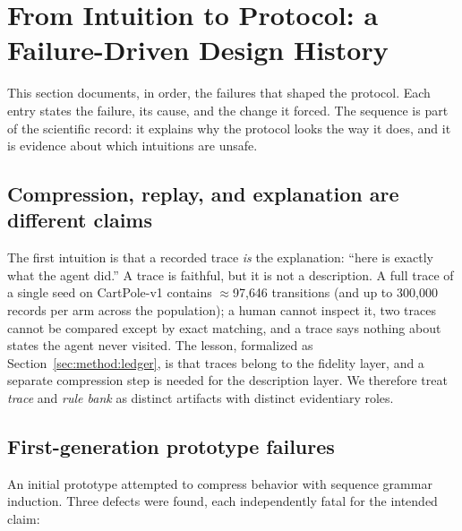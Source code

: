 \documentclass[11pt]{article}
\begin{document}
\section{From Intuition to Protocol: a Failure-Driven Design History}
\label{sec:evolution}

This section documents, in order, the failures that shaped the protocol. Each entry states the
failure, its cause, and the change it forced. The sequence is part of the scientific record: it
explains why the protocol looks the way it does, and it is evidence about which intuitions are
unsafe.

\subsection{Compression, replay, and explanation are different claims}
\label{sec:evolution:replay}

The first intuition is that a recorded trace \emph{is} the explanation: ``here is exactly what the
agent did.'' A trace is faithful, but it is not a description. A full trace of a single seed on
CartPole-v1 contains $\approx$97{,}646 transitions (and up to 300{,}000 records per arm across the
population); a human cannot inspect it, two traces cannot be compared except by exact matching, and
a trace says nothing about states the agent never visited. The lesson, formalized as
Section~\ref{sec:method:ledger}, is that traces belong to the fidelity layer, and a separate
compression step is needed for the description layer. We therefore treat \emph{trace} and
\emph{rule bank} as distinct artifacts with distinct evidentiary roles.

\subsection{First-generation prototype failures}
\label{sec:evolution:v1}

An initial prototype attempted to compress behavior with sequence grammar induction. Three defects
were found, each independently fatal for the intended claim:
\end{document}
